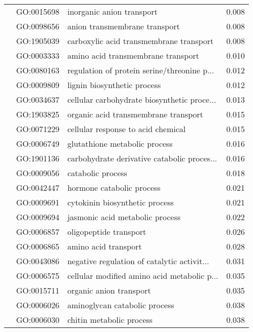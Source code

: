 \begin{longtable}{lllr}
   & GO:0015698 &                    inorganic anion transport &         0.008 \\
   & GO:0098656 &                anion transmembrane transport &         0.008 \\
   & GO:1905039 &      carboxylic acid transmembrane transport &         0.008 \\
   & GO:0003333 &           amino acid transmembrane transport &         0.010 \\
   & GO:0080163 &  regulation of protein serine/threonine p... &         0.012 \\
   & GO:0009809 &                  lignin biosynthetic process &         0.012 \\
   & GO:0034637 &  cellular carbohydrate biosynthetic proce... &         0.013 \\
   & GO:1903825 &         organic acid transmembrane transport &         0.015 \\
   & GO:0071229 &           cellular response to acid chemical &         0.015 \\
   & GO:0006749 &                glutathione metabolic process &         0.016 \\
   & GO:1901136 &  carbohydrate derivative catabolic proces... &         0.016 \\
   & GO:0009056 &                            catabolic process &         0.018 \\
   & GO:0042447 &                    hormone catabolic process &         0.021 \\
   & GO:0009691 &               cytokinin biosynthetic process &         0.021 \\
   & GO:0009694 &              jasmonic acid metabolic process &         0.022 \\
   & GO:0006857 &                       oligopeptide transport &         0.026 \\
   & GO:0006865 &                         amino acid transport &         0.028 \\
   & GO:0043086 &  negative regulation of catalytic activit... &         0.031 \\
   & GO:0006575 &  cellular modified amino acid metabolic p... &         0.035 \\
   & GO:0015711 &                      organic anion transport &         0.035 \\
   & GO:0006026 &                aminoglycan catabolic process &         0.038 \\
   & GO:0006030 &                     chitin metabolic process &         0.038 \\

\end{longtable}
